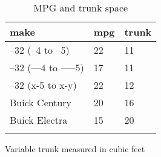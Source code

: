 \documentclass{article}
\begin{document}
\begin{table}[tbp] \centering
{}

\caption{MPG and trunk space}
\begin{tabularx}{\linewidth}{lCC}

\toprule
{make}&{mpg}&{trunk} \tabularnewline
\midrule \addlinespace[\belowrulesep]
--32 (--4 to --5)&22&11 \tabularnewline
--32 (---4 to -----5)&17&11 \tabularnewline
--32 (x-5 to x-y)&22&12 \tabularnewline
Buick Century&20&16 \tabularnewline
Buick Electra&15&20 \tabularnewline
\bottomrule \addlinespace[\belowrulesep]

\end{tabularx}
\begin{flushleft}
\footnotesize Variable trunk measured in cubic feet
\end{flushleft}
\end{table}
\end{document}
